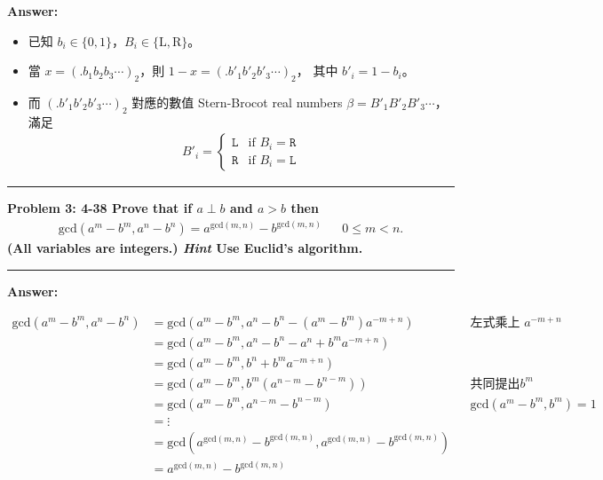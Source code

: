 \documentclass[11pt]{article}
\newcommand\question[2]{\vspace{.25in}\hrule\textbf{#1: #2}\vspace{.5em}\hrule\vspace{.10in}}
\renewcommand\part[1]{\vspace{.10in}\textbf{#1}}
\begin{document}
\part{Answer:}

\begin{itemize}
	\item 已知 $b_i \in \{0, 1\}$，$B_i \in \{\text{L}, \text{R}\}$。
	\item 當 $x = (.b_1 b_2 b_3 \cdots)_2$，則 $1-x = (.b'_1 b'_2 b'_3 \cdots)_2$，
		其中 $b'_i = 1 - b_i$。
	\item 而 $(.b'_1 b'_2 b'_3 \cdots)_2$ 對應的數值 Stern-Brocot real numbers 
		$\beta = B'_1 B'_2 B'_3 \cdots$，滿足
		\begin{align*}
			B'_i = \left\{\begin{matrix}
				\texttt{L} & \text{if } B_i = \texttt{R} \\
				\texttt{R} & \text{if } B_i = \texttt{L}
			\end{matrix}\right.
		\end{align*}
\end{itemize}

\question{Problem 3} {4-38 Prove that if $a \perp b$ and $a > b$ then
	\begin{align*}	
		\text{gcd}(a^m - b^m, a^n - b^n) = a^{\text{gcd}(m, n)}
			- b^{\text{gcd}(m, n)} && 0 \le m < n.
	\end{align*}
	(All variables are integers.) \textit{Hint} Use Euclid's algorithm.
}

\part{Answer:}

\begin{align*}
	\text{gcd}(a^m - b^m, a^n - b^n) 
		&= \text{gcd}(a^m - b^m, a^n - b^n - (a^m - b^m) a^{-m+n}) && \text{左式乘上 } a^{-m+n}\\
		&= \text{gcd}(a^m - b^m, a^n - b^n - a^n + b^m a^{-m+n}) \\
		&= \text{gcd}(a^m - b^m, b^n + b^m a^{-m+n}) \\
		&= \text{gcd}(a^m - b^m, b^m (a^{n-m} - b^{n-m})) && \text{共同提出} b^m\\
		&= \text{gcd}(a^m - b^m, a^{n-m} - b^{n-m}) && \text{gcd}(a^m - b^m, b^m) = 1\\
		&= \vdots \\
		&= \text{gcd}(a^{\text{gcd}(m, n)} - b^{\text{gcd}(m, n)}, a^{\text{gcd}(m, n)} - b^{\text{gcd}(m, n)}) \\
		&= a^{\text{gcd}(m, n)} - b^{\text{gcd}(m, n)}
\end{align*}
\end{document}
